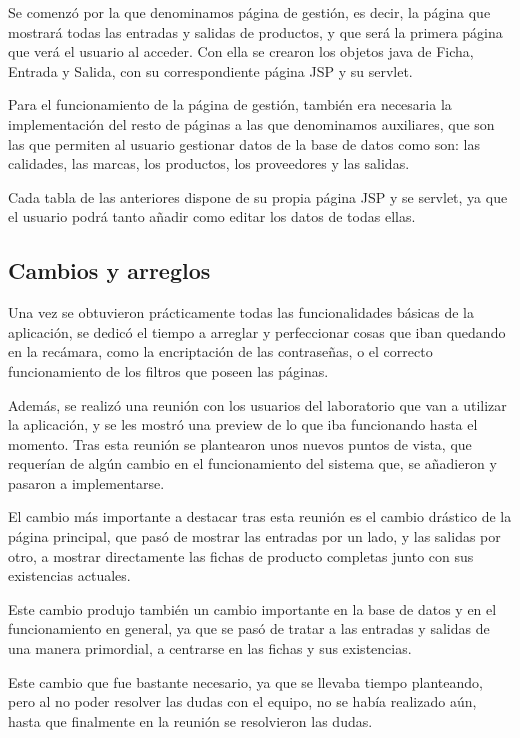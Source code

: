 Se comenzó por la que denominamos página de gestión, es decir, la página que mostrará todas las entradas y salidas de productos, y que será la primera página que verá el usuario al acceder. Con ella se crearon los objetos java de Ficha, Entrada y Salida, con su correspondiente página JSP y su servlet.

Para el funcionamiento de la página de gestión, también era necesaria la implementación del resto de páginas a las que denominamos auxiliares, que son las que permiten al usuario gestionar datos de la base de datos como son: las calidades, las marcas, los productos, los proveedores y las salidas.

Cada tabla de las anteriores dispone de su propia página JSP y se servlet, ya que el usuario podrá tanto añadir como editar los datos de todas ellas.


\subsection{Cambios y arreglos}

Una vez se obtuvieron prácticamente todas las funcionalidades básicas de la aplicación, se dedicó el tiempo a arreglar y perfeccionar cosas que iban quedando en la recámara, como la encriptación de las contraseñas, o el correcto funcionamiento de los filtros que poseen las páginas. 

Además, se realizó una reunión con los usuarios del laboratorio que van a utilizar la aplicación, y se les mostró una preview de lo que iba funcionando hasta el momento. Tras esta reunión se plantearon unos nuevos puntos de vista, que requerían de algún cambio en el funcionamiento del sistema que, se añadieron y pasaron a implementarse.

El cambio más importante a destacar tras esta reunión es el cambio drástico de la página principal, que pasó de mostrar las entradas por un lado, y las salidas por otro, a mostrar directamente las fichas de producto completas junto con sus existencias actuales.

Este cambio produjo también un cambio importante en la base de datos y en el funcionamiento en general, ya que se pasó de tratar a las entradas y salidas de una manera primordial, a centrarse en las fichas y sus existencias. 

Este cambio que fue bastante necesario, ya que se llevaba tiempo planteando, pero al no poder resolver las dudas con el equipo, no se había realizado aún, hasta que finalmente en la reunión se resolvieron las dudas.

